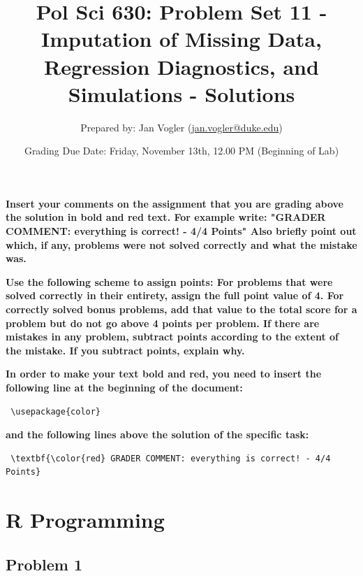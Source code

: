 \documentclass[12pt]{article}\usepackage[]{graphicx}\usepackage[]{color}
\begin{document}
\title{Pol Sci 630: Problem Set 11 - Imputation of Missing Data, Regression Diagnostics, and Simulations - Solutions}

\author{Prepared by: Jan Vogler (\href{mailto:jan.vogler@duke.edu}{jan.vogler@duke.edu})}

\date{Grading Due Date: Friday, November 13th, 12.00 PM (Beginning of Lab)}
 
\maketitle



\textbf{\color{red} Insert your comments on the assignment that you are grading above the solution in bold and red text. For example write: "GRADER COMMENT: everything is correct! - 4/4 Points" Also briefly point out which, if any, problems were not solved correctly and what the mistake was.}

\bigskip

\textbf{Use the following scheme to assign points: For problems that were solved correctly in their entirety, assign the full point value of 4. For correctly solved bonus problems, add that value to the total score for a problem but do not go above 4 points per problem. If there are mistakes in any problem, subtract points according to the extent of the mistake. If you subtract points, explain why.}

\bigskip

\textbf{In order to make your text bold and red, you need to insert the following line at the beginning of the document:}

\begin{verbatim} \usepackage{color} \end{verbatim}

\textbf{and the following lines above the solution of the specific task:}

\begin{verbatim} \textbf{\color{red} GRADER COMMENT: everything is correct! - 4/4 Points} \end{verbatim}



\pagebreak

\section*{R Programming}

\subsection*{Problem 1}
\end{document}
